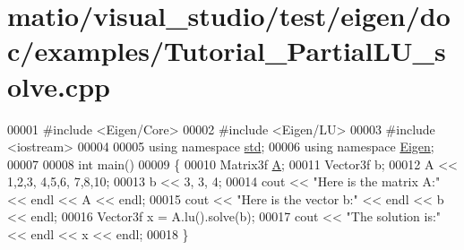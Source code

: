 \hypertarget{matio_2visual__studio_2test_2eigen_2doc_2examples_2_tutorial___partial_l_u__solve_8cpp_source}{}\section{matio/visual\+\_\+studio/test/eigen/doc/examples/\+Tutorial\+\_\+\+Partial\+L\+U\+\_\+solve.cpp}
\label{matio_2visual__studio_2test_2eigen_2doc_2examples_2_tutorial___partial_l_u__solve_8cpp_source}

\begin{DoxyCode}
00001 \textcolor{preprocessor}{#include <Eigen/Core>}
00002 \textcolor{preprocessor}{#include <Eigen/LU>}
00003 \textcolor{preprocessor}{#include <iostream>}
00004 
00005 \textcolor{keyword}{using namespace }\hyperlink{namespacestd}{std};
00006 \textcolor{keyword}{using namespace }\hyperlink{namespace_eigen}{Eigen};
00007 
00008 \textcolor{keywordtype}{int} main()
00009 \{
00010    Matrix3f \hyperlink{group___core___module_class_eigen_1_1_matrix}{A};
00011    Vector3f b;
00012    A << 1,2,3,  4,5,6,  7,8,10;
00013    b << 3, 3, 4;
00014    cout << \textcolor{stringliteral}{"Here is the matrix A:"} << endl << A << endl;
00015    cout << \textcolor{stringliteral}{"Here is the vector b:"} << endl << b << endl;
00016    Vector3f x = A.lu().solve(b);
00017    cout << \textcolor{stringliteral}{"The solution is:"} << endl << x << endl;
00018 \}
\end{DoxyCode}
